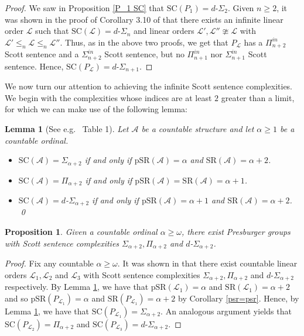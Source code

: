 \documentclass{amsart}%
\numberwithin{theorem}{section}
\newtheorem{lemma}[theorem]{Lemma}
\newtheorem{proposition}[theorem]{Proposition}
\newcommand{\A}{\mathcal{A}}
\newcommand{\0}{\emptyset}
\newcommand{\LL}{\mathcal{L}}
\newcommand{\SR}{\text{SR}}
\newcommand{\pSR}{\text{pSR}}
\newcommand{\SC}{\text{SC}}
\begin{document}
\begin{proof}
    We saw in Proposition \ref{P_1 SC} that $\SC(P_1)=d$-$\Sigma_2$. 
    Given $n\geq 2$, it was shown in the proof of Corollary 3.10 of \cite{david-dino} that there exists an infinite linear order $\LL$ such that $\SC(\LL)=d$-$\Sigma_n$ and linear orders $\LL',\LL''\ncong \LL$ with $\LL'\leq_n\LL\leq_n\LL''$. Thus, as in the above two proofs, we get that $P_\LL$ has a $\Pi^{in}_{n+2}$ Scott sentence and a $\Sigma^{in}_{n+2}$ Scott sentence, but no $\Pi^{in}_{n+1}$ nor $\Sigma^{in}_{n+1}$ Scott sentence. Hence, $\SC(P_\LL)=d$-$\Sigma_{n+1}$.  
\end{proof}

We now turn our attention to achieving the infinite Scott sentence complexities. We begin with the complexities whose indices are at least $2$ greater than a limit, for which we can make use of the following lemma: 

 \begin{lemma}[See e.g.\ \cite{CST} Table 1]
    \label{alpha+2}
    Let $\A$ be a countable structure and let $\alpha\geq 1$ be a countable ordinal.
    \begin{itemize}
        \item $\SC(\A)=\Sigma_{\alpha+2}$ if and only if $\pSR(\A)=\alpha$ and $\SR(\A)=\alpha + 2$. 
        \item $\SC(\A)=\Pi_{\alpha+2}$ if and only if $\pSR(\A)=\SR(\A)= \alpha+1$.
        \item $\SC(\A)=d$-$\Sigma_{\alpha+2}$ if and only if $\pSR(\A)=\alpha +1$ and $\SR(\A)=\alpha +2$. \qed
    \end{itemize}
        
    \end{lemma}

\begin{proposition}
\label{sc alpha+2}
    Given a countable ordinal $\alpha\geq \omega$, there exist Presburger groups with Scott sentence complexities $\Sigma_{\alpha+2}, \Pi_{\alpha+2}$ and $d$-$\Sigma_{\alpha+2} $.
\end{proposition}

\begin{proof}
    Fix any countable $\alpha\geq\omega$. It was shown in \cite{david-dino} that there exist countable linear orders $\LL_1,\LL_2$ and $\LL_3$ with Scott sentence complexities $\Sigma_{\alpha+2}, \Pi_{\alpha+2}$ and $d$-$\Sigma_{\alpha+2} $ respectively. By Lemma \ref{alpha+2}, we have that $\pSR(\LL_1)=\alpha$ and $\SR(\LL_1)=\alpha+2$ and so $\pSR(P_{\LL_1})=\alpha$  and $\SR(P_{\LL_1})=\alpha +2$ by Corollary \ref{psr=psr}. Hence, by Lemma \ref{alpha+2}, we have that $\SC(P_{\LL_1})=\Sigma_{\alpha+2}$. An analogous argument yields that $\SC(P_{\LL_2})=\Pi_{\alpha+2}$ and $\SC(P_{\LL_3})=d$-$\Sigma_{\alpha+2}$.
\end{proof}
\end{document}
